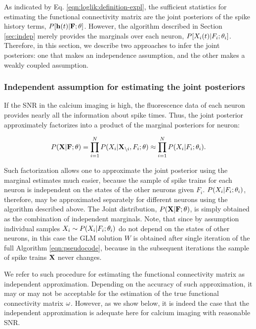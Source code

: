 As indicated by Eq. \eqref{eqn:loglik:definition-expl}, the sufficient statistics for estimating the functional connectivity matrix are the joint posteriors of the spike history terms, $P[\mathbf{h}(t) | {\bf F}; \mathbf{\theta}]$.  However, the algorithm described in Section \ref{sec:indep} merely provides the marginals over each neuron, $P[X_i(t) | F_i; \mathbf{\theta}_i]$.  Therefore, in this section, we describe two approaches to infer the joint posteriors: one that makes an independence assumption, and the other makes a weakly coupled assumption.

\subsubsection{Independent assumption for estimating the joint posteriors}

If the SNR in the calcium imaging is high,  the fluorescence data of each neuron provides nearly all the information about spike times.  Thus, the joint posterior approximately factorizes into a product of the marginal posteriors for neuron:

\begin{equation} 
	P({\bf X}|{\bf F};\theta) = \prod_{i=1}^N P(X_i | {\bf X}_{\backslash i}, F_i; \mathbf{\theta}) \approx\prod_{i=1}^N P(X_i|F_i; \mathbf{\theta}_i). \end{equation}
	
\noindent Such factorization allows one to approximate the joint posterior using the marginal estimates much easier, because the sample of spike trains for each neuron is independent on the states of the other neurons given $F_i$. $P(X_i|F_i;\mathbf{\theta}_i)$, therefore, may be approximated separately for different neurons using the algorithm described above. The Joint distribution, $P({\bf X}|{\bf F};\theta)$, is simply obtained as the combination of independent marginals. Note, that since by assumption individual samples $X_i\sim P(X_i|F_i;\mathbf{\theta}_i)$ do not depend on the states of other neurons, in this case the GLM solution $W$ is obtained after single iteration of the full Algorithm \ref{eqn:pseudocode}, because in the subsequent iterations the sample of spike trains ${\bf X}$ never changes.

We refer to such procedure for estimating the functional connectivity matrix as independent approximation. Depending on the accuracy of such approximation, it may or may not be acceptable for the estimation of the true functional connectivity matrix $\mathbf{\omega}$. However, as we show below, it is indeed the case that the independent approximation is adequate here for calcium imaging with reasonable SNR.

